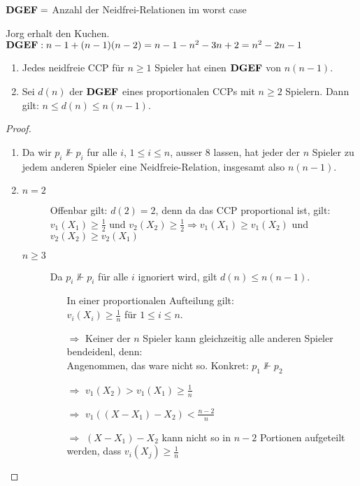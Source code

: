 $\text{\textbf{DGEF}} =$ Anzahl der Neidfrei-Relationen im worst case
\begin{protokoll*}
 Jorg erhalt den Kuchen.\\
 $\text{\textbf{DGEF}}: n-1+(n-1)(n-2)=n-1-n^2-3n+2=n^2-2n-1$
\end{protokoll*}
\begin{satz*}
 \begin{enumerate}
  \item Jedes neidfreie CCP für $n\geq1$ Spieler hat einen $\text{\textbf{DGEF}}$ von $n(n-1)$.
  \item Sei $d(n)$ der $\text{\textbf{DGEF}}$ eines proportionalen CCPs mit $n\geq2$ Spielern. Dann gilt: $n\leq d(n)\leq n(n-1)$.
 \end{enumerate}
\end{satz*}
\begin{proof}
 \begin{enumerate}
  \item Da wir $p_i\nVdash p_i$ fur alle $i$, $1\leq i\leq n$, ausser 8 lassen, hat jeder der $n$ Spieler zu jedem anderen Spieler eine
        Neidfreie-Relation, insgesamt also $n(n-1)$.
  \item \begin{description}
         \item[$n=2$] Offenbar gilt: $d(2)=2$, denn da das CCP proportional ist, gilt: $v_1(X_1)\geq\frac{1}{2}$ und $v_2(X_2)\geq\frac{1}{2}
                    \Rightarrow v_1(X_1)\geq v_1(X_2)$ und $v_2(X_2)\geq v_2(X_1)$
         \item[$n\geq3$] Da $p_i\nVdash p_i$ für alle $i$ ignoriert wird, gilt $d(n)\leq n(n-1)$.
                         \begin{itemize}
                          \item[] In einer proportionalen Aufteilung gilt:\\$v_i(X_i)\geq\frac{1}{n}$ für $1\leq i\leq n$.\\
                          \item[$\Rightarrow$] Keiner der $n$ Spieler kann gleichzeitig alle anderen Spieler bendeidenl, denn:\\
                                               Angenommen, das ware nicht so. Konkret: $p_1\nVdash p_2$
                          \item[$\Rightarrow$]$v_1(X_2)>v_1(X_1)\geq\frac{1}{n}$
                          \item[$\Rightarrow$]$v_1((X-X_1)-X_2)<\frac{n-2}{n}$
                          \item[$\Rightarrow$]$(X-X_1)-X_2$ kann nicht so in $n-2$ Portionen aufgeteilt werden, dass $v_i(X_j)\geq\frac{1}{n}$

\end{itemize}
\end{description}
\end{enumerate}
\end{proof}
